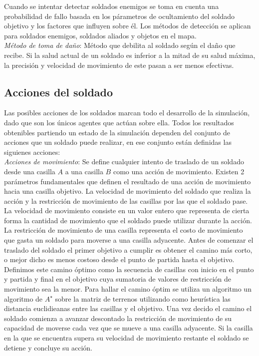 \documentclass[twoside]{article}
\begin{document}
		Cuando se intentar detectar soldados enemigos se toma en cuenta una probabilidad de fallo basada en los p\'arametros de ocultamiento del soldado objetivo y los factores que influyen sobre \'el.
		Los m\'etodos de detecci\'on se aplican para soldados enemigos, soldados aliados y objetos en el mapa.\\
		
		\emph{M\'etodo de toma de da\~no}: M\'etodo que debilita al soldado seg\'un el da\~no que recibe. Si la salud actual de un soldado es inferior a la mitad de su salud m\'axima, la precisi\'on y velocidad de movimiento de este pasan a ser menos efectivas.
		
		\subsection{Acciones del soldado}
		
		Las posibles acciones de los soldados marcan todo el desarrollo de la simulaci\'on, dado que son los \'unicos agentes que act\'uan sobre ella. Todos los resultados obtenibles partiendo un estado de la simulaci\'on dependen del conjunto de acciones que un soldado puede realizar, en ese conjunto est\'an definidas las siguienes acciones:\\
		
		\emph{Acciones de movimiento}: Se define cualquier intento de traslado de un soldado desde una casilla $A$ a una casilla $B$ como una acci\'on de movimiento.
		Existen 2 par\'ametros fundamentales que definen el resultado de una acci\'on de movimiento hacia una casilla objetivo. La velocidad de movimiento del soldado que realiza la acci\'on y la restricci\'on de movimiento de las casillas por las que el soldado pase.
		La velocidad de movimiento consiste en un valor entero que representa de cierta forma la cantidad de movimiento que el soldado puede utilizar durante la acci\'on.
		La restricci\'on de movimiento de una casilla representa el costo de movimiento que gasta un soldado para moverse a una casilla adyacente.
		Antes de comenzar el traslado del soldado el primer objetivo a cumplir es obtener el camino m\'as corto, o mejor dicho es menos costoso desde el punto de partida hasta el objetivo. Definimos este camino \'optimo como la secuencia de casillas con inicio en el punto y partida y final en el objetivo cuya sumatoria de valores de restricci\'on de movimiento sea la menor. 
		Para hallar el camino \'optim se utiliza un algoritmo un algoritmo de $A^\star$ sobre la matriz de terrenos utilizando como heur\'istica las distancia euclidieanas entre las casillas y el objetivo.
		Una vez decido el camino el soldado comienza a avanzar descontado la restricci\'on de movimiento de su capacidad de moverse cada vez que se mueve a una casilla adyacente. Si la casilla en la que se encuentra supera su velocidad de movimiento restante el soldado se detiene y concluye su acci\'on.\\
		
\end{document}

